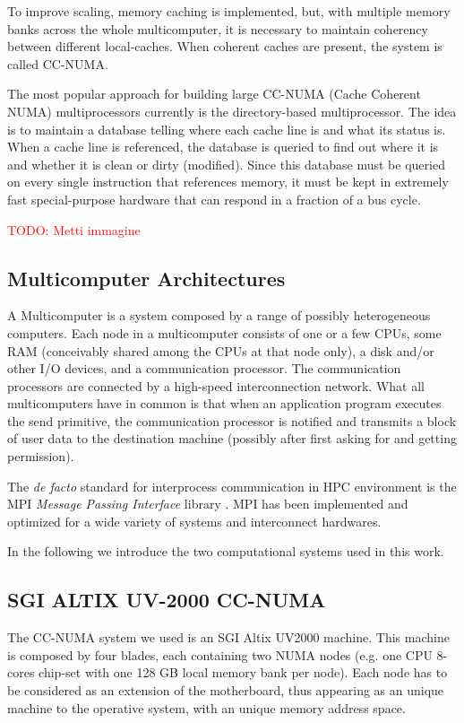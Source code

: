 \documentclass[a4paper,12pt]{article}
\newcommand\mynotes[1]{\begin{flushright}

\textcolor{red}{TODO: #1}\end{flushright}}
\begin{document}
To improve scaling, memory caching is implemented, but, with multiple memory banks across the whole multicomputer, it is necessary to maintain coherency between different local-caches.  
When coherent caches are present, the system is called CC-NUMA.

The most popular approach for building large CC-NUMA (Cache Coherent
NUMA) multiprocessors currently is the directory-based multiprocessor. The
idea is to maintain a database telling where each cache line is and what its status is.
When a cache line is referenced, the database is queried to find out where it is and
whether it is clean or dirty (modified). Since this database must be queried on
every single instruction that references memory, it must be kept in extremely fast
special-purpose hardware that can respond in a fraction of a bus cycle.

\mynotes{Metti immagine}

\subsection{Multicomputer Architectures}
A Multicomputer is a system composed by a range of possibly heterogeneous computers.
Each node in a multicomputer consists of one or a few CPUs, some RAM (conceivably shared among the CPUs at that node only), a disk and/or other I/O devices, and a communication processor. 
The communication processors are connected by a high-speed interconnection network. 
What all multicomputers have in common is that when an application program executes the send primitive, the communication processor is notified and transmits a block of user data to the destination machine (possibly after first asking for and getting permission).

The \textit{de facto} standard for interprocess communication in HPC environment is the MPI \textit{Message Passing Interface} library \cite{MPI}.
MPI has been implemented and optimized for a wide variety of systems and interconnect hardwares.


In the following we introduce the two computational systems used in this work.



\subsection{SGI ALTIX UV-2000 CC-NUMA}\label{numaarch:sec}

The CC-NUMA system we used is an SGI Altix UV2000 machine.
This machine is composed by four blades, each containing two NUMA nodes (e.g. one CPU 8-cores chip-set with one 128 GB local memory bank per node). 
Each node has to be considered as an extension of the motherboard, thus appearing as an unique machine to the operative system, with an unique memory address space.
\end{document}
